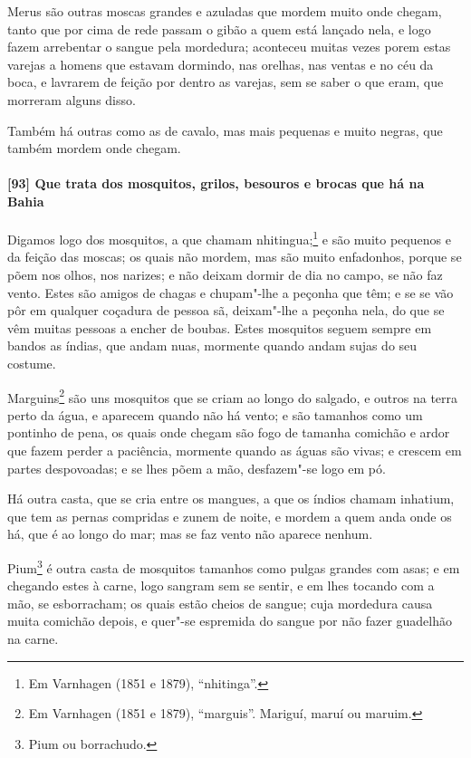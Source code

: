 \begin{linenumbers}
Merus são outras moscas grandes e azuladas que mordem muito onde chegam, tanto que por
cima de rede passam o gibão a quem está lançado nela, e logo fazem arrebentar o sangue
pela mordedura; aconteceu muitas vezes porem estas varejas a homens que estavam dormindo,
nas orelhas, nas ventas e no céu da boca, e lavrarem de feição por dentro as varejas, sem
se saber o que eram, que morreram alguns disso.

Também há outras como as de cavalo, mas mais pequenas e muito negras, que também mordem
onde chegam.

\paragraph{[93] Que trata dos mosquitos, grilos, besouros e brocas que há na Bahia}\quad
Digamos logo dos mosquitos, a que chamam nhitingua;\footnote{ Em Varnhagen (1851 e 1879),
``nhitinga''.} e são muito pequenos e da feição das moscas; os quais não mordem, mas são
muito enfadonhos, porque se põem nos olhos, nos narizes; e não deixam dormir de dia no
campo, se não faz vento. Estes são amigos de chagas e chupam"-lhe a peçonha que têm; e se
se vão pôr em qualquer coçadura de pessoa sã, deixam"-lhe a peçonha nela, do que se vêm
muitas pessoas a encher de boubas. Estes mosquitos seguem sempre em bandos as índias, que
andam nuas, mormente quando andam sujas do seu costume.

Marguins\footnote{ Em Varnhagen (1851 e 1879), ``marguis''. Mariguí, maruí ou maruim.} são
uns mosquitos que se criam ao longo do salgado, e outros na terra perto da água, e
aparecem quando não há vento; e são tamanhos como um pontinho de pena, os quais onde
chegam são fogo de tamanha comichão e ardor que fazem perder a paciência, mormente quando
as águas são vivas; e crescem em partes despovoadas; e se lhes põem a mão, desfazem"-se
logo em pó.

Há outra casta, que se cria entre os mangues, a que os índios chamam inhatium, que tem as
pernas compridas e zunem de noite, e mordem a quem anda onde os há, que é ao longo do mar;
mas se faz vento não aparece nenhum.

Pium\footnote{ Pium ou borrachudo.} é outra casta de mosquitos tamanhos como pulgas
grandes com asas; e em chegando estes à carne, logo sangram sem se sentir, e em lhes
tocando com a mão, se esborracham; os quais estão cheios de sangue; cuja mordedura causa
muita comichão depois, e quer"-se espremida do sangue por não fazer guadelhão na carne.



\end{linenumbers}
